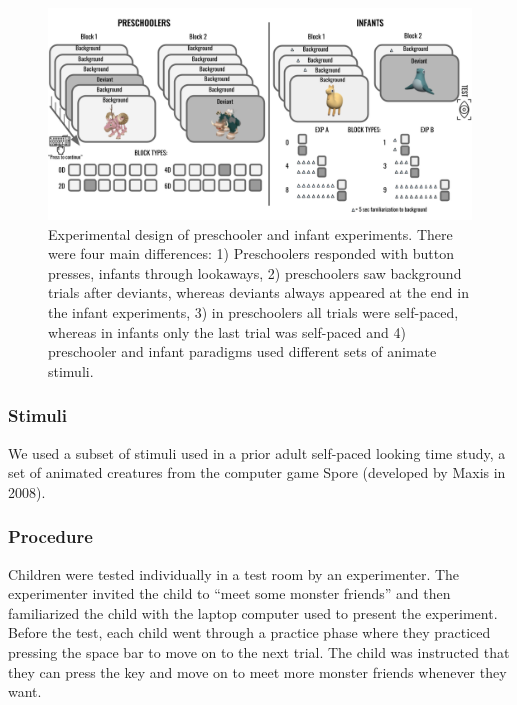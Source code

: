 \documentclass[10pt, letterpaper]{article}
\newenvironment{CodeChunk}{}{}
\begin{document}
\begin{CodeChunk}
\begin{figure}[h]

{\centering \includegraphics{figs/experimental_design-1} 

}

\caption[Experimental design of preschooler and infant experiments]{Experimental design of preschooler and infant experiments. There were four main differences: 1) Preschoolers responded with button presses, infants through lookaways, 2) preschoolers saw background trials after deviants, whereas deviants always appeared at the end in the infant experiments, 3) in preschoolers all trials were self-paced, whereas in infants only the last trial was self-paced and 4) preschooler and infant paradigms used different sets of animate stimuli.}\label{fig:experimental_design}
\end{figure}
\end{CodeChunk}

\hypertarget{stimuli}{%
\subsubsection{Stimuli}\label{stimuli}}

We used a subset of stimuli used in a prior adult self-paced looking
time study, a set of animated creatures from the computer game Spore
(developed by Maxis in 2008).

\hypertarget{procedure}{%
\subsubsection{Procedure}\label{procedure}}

Children were tested individually in a test room by an experimenter. The
experimenter invited the child to ``meet some monster friends'' and then
familiarized the child with the laptop computer used to present the
experiment. Before the test, each child went through a practice phase
where they practiced pressing the space bar to move on to the next
trial. The child was instructed that they can press the key and move on
to meet more monster friends whenever they want.
\end{document}
